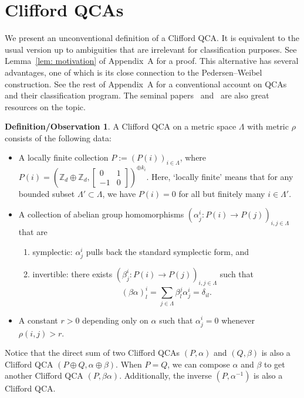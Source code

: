 \documentclass{article}
\theoremstyle{definition}
\newtheorem{defobs}{Definition/Observation}
\begin{document}
\section{Clifford QCAs}


We present an unconventional definition of a Clifford QCA. It is equivalent to the usual version up to ambiguities that are irrelevant for classification purposes. See Lemma~\ref{lem: motivation} of Appendix~A for a proof. This alternative has several advantages, one of which is its close connection to the Pedersen–Weibel construction. See the rest of Appendix~A for a conventional account on QCAs and their classification program. The seminal papers~\cite{freedman2020classification} and~\cite{haah2021clifford} are also great resources on the topic. 
\begin{defobs}    \label{obs:keyobservation}
A Clifford QCA on a metric space $\Lambda$ with metric $\rho$ consists of the following data:
\begin{itemize}
    \item  A locally finite collection $P := (P(i))_{i \in \Lambda}$, where
$P(i) = \left(\mathbb{Z}_d \oplus \mathbb{Z}_d,
\begin{bmatrix}
0 & 1 \\
-1 & 0
\end{bmatrix}
\right)^{\oplus k_i}$.
Here, `locally finite' means that for any bounded subset $\Lambda' \subset \Lambda$, we have $P(i)=0$ for all but finitely many $i \in \Lambda'$.
    \item A collection of abelian group homomorphisms $(\alpha_j^i: P(i)\rightarrow P(j))_{i, j\in \Lambda}$ that are
    \begin{enumerate}
        \item symplectic: $\alpha^i_j$ pulls back the standard symplectic form, and
        \item invertible: there exists $(\beta_j^i: P(i)\rightarrow P(j))_{i, j\in \Lambda}$ such that
    $$(\beta \alpha)^i_l = \sum_{j \in \Lambda} \beta^j_l \alpha^i_j=\delta_{il}.$$
    
\end{enumerate}

\item A constant $r>0$ depending only on $\alpha$ such that $\alpha^i_j=0$ whenever $\rho(i,j)>r$.
\end{itemize}
\end{defobs}
Notice that the direct sum of two Clifford QCAs $(P, \alpha)$ and $(Q, \beta)$ is also a Clifford QCA $(P\oplus Q, \alpha \oplus \beta).$ When $P=Q$, we can compose $\alpha$ and $\beta$ to get another Clifford QCA $(P, \beta\alpha)$. Additionally, the inverse $(P, \alpha^{-1})$ is also a Clifford QCA. 
 
\end{document}
